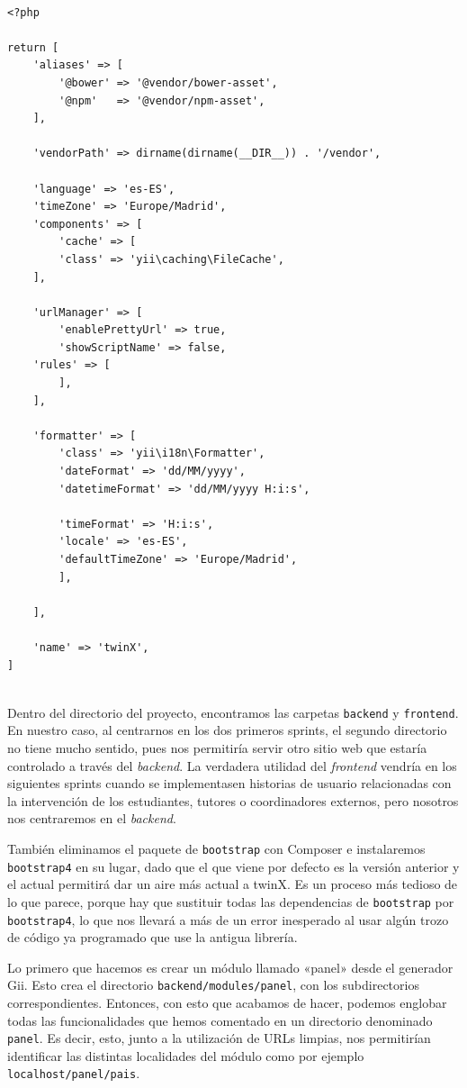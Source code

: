 \begin{verbatim}
	
<?php

return [
	'aliases' => [
		'@bower' => '@vendor/bower-asset',
		'@npm'   => '@vendor/npm-asset',
	],
	
	'vendorPath' => dirname(dirname(__DIR__)) . '/vendor',
	
	'language' => 'es-ES',
	'timeZone' => 'Europe/Madrid',
	'components' => [
		'cache' => [
		'class' => 'yii\caching\FileCache',
	],
	
	'urlManager' => [
		'enablePrettyUrl' => true,
		'showScriptName' => false,
	'rules' => [
		],
	],
	
	'formatter' => [
		'class' => 'yii\i18n\Formatter',
		'dateFormat' => 'dd/MM/yyyy',
		'datetimeFormat' => 'dd/MM/yyyy H:i:s',
		
		'timeFormat' => 'H:i:s',
		'locale' => 'es-ES',
		'defaultTimeZone' => 'Europe/Madrid',
		],
	
	],
	
	'name' => 'twinX',
]
	
\end{verbatim}

Dentro del directorio del proyecto, encontramos las carpetas \texttt{backend} y \texttt{frontend}. En nuestro caso, al centrarnos en los dos primeros sprints, el segundo directorio no tiene mucho sentido, pues nos permitiría servir otro sitio web que estaría controlado a través del \textit{backend}. La verdadera utilidad del \textit{frontend} vendría en los siguientes sprints cuando se implementasen historias de usuario relacionadas con la intervención de los estudiantes, tutores o coordinadores externos, pero nosotros nos centraremos en el \textit{backend}.

También eliminamos el paquete de \texttt{bootstrap} con Composer e instalaremos \texttt{bootstrap4} en su lugar, dado que el que viene por defecto es la versión anterior y el actual permitirá dar un aire más actual a twinX. Es un proceso más tedioso de lo que parece, porque hay que sustituir todas las dependencias de \texttt{bootstrap} por \texttt{bootstrap4}, lo que nos llevará a más de un error inesperado al usar algún trozo de código ya programado que use la antigua librería.

Lo primero que hacemos es crear un módulo llamado «panel» desde el generador Gii. Esto crea el directorio \texttt{backend/modules/panel}, con los subdirectorios correspondientes. Entonces, con esto que acabamos de hacer, podemos englobar todas las funcionalidades que hemos comentado en un directorio denominado \texttt{panel}. Es decir, esto, junto a la utilización de URLs limpias, nos permitirían identificar las distintas localidades del módulo como por ejemplo \texttt{localhost/panel/pais}.

